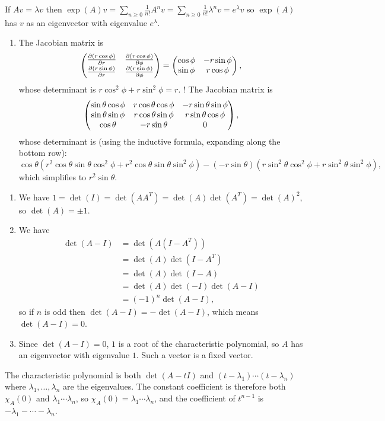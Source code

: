 \documentclass{article}
\begin{document}
\begin{Solution}
If \(Av=\lambda v\) then \(\exp(A)v=\sum_{n\geq
0}\frac{1}{n!}A^nv=\sum_{n\geq
0}\frac{1}{n!}\lambda^nv=e^{\lambda}v\) so \(\exp(A)\) has \(v\) as
an eigenvector with eigenvalue \(e^{\lambda}\).


\end{Solution}
\begin{Solution}
\begin{enumerate}
\item The Jacobian matrix is \[\begin{pmatrix} \frac{\partial(r\cos\phi)}{\partial
r} & \frac{\partial(r\cos\phi)}{\partial \phi}
\\ \frac{\partial(r\sin\phi)}{\partial r} &
\frac{\partial(r\sin\phi)}{\partial\phi}\end{pmatrix}=\begin{pmatrix} \cos\phi &
-r\sin\phi \\ \sin\phi & r\cos\phi\end{pmatrix},\] whose determinant is
\(r\cos^2\phi+r\sin^2\phi=r\). ! The Jacobian matrix is \[\begin{pmatrix}
\sin\theta\cos\phi & r\cos\theta\cos\phi & -r\sin\theta\sin\phi
\\ \sin\theta\sin\phi & r\cos\theta\sin\phi & r\sin\theta\cos\phi
\\ \cos\theta & -r\sin\theta & 0\end{pmatrix},\] whose determinant is (using
the inductive formula, expanding along the bottom row):
\[\cos\theta(r^2\cos\theta\sin\theta\cos^2\phi +
r^2\cos\theta\sin\theta\sin^2\phi) -
(-r\sin\theta)(r\sin^2\theta\cos^2\phi +
r\sin^2\theta\sin^2\phi),\] which simplifies to \(r^2\sin\theta\).


\end{enumerate}
\end{Solution}
\begin{Solution}\label{sol:exr:orthaxis}
\begin{enumerate}
\item We have \(1=\det(I)=\det(AA^T)=\det(A)\det(A^T)=\det(A)^2\), so
\(\det(A)=\pm 1\).
\item We have
\begin{align*}
\det(A-I)&=\det(A(I-A^T))\\
&=\det(A)\det(I-A^T)\\
&=\det(A)\det(I-A)\\
&=\det(A)\det(-I)\det(A-I)\\
&=(-1)^n\det(A-I),
\end{align*}
so if \(n\) is odd then \(\det(A-I)=-\det(A-I)\), which means
\(\det(A-I)=0\).
\item Since \(\det(A-I)=0\), \(1\) is a root of the characteristic
polynomial, so \(A\) has an eigenvector with eigenvalue
\(1\). Such a vector is a fixed vector. \qedhere


\end{enumerate}
\end{Solution}
\begin{Solution}
The characteristic polynomial is both \(\det(A-tI)\) and
\((t-\lambda_1)\cdots(t-\lambda_n)\) where
\(\lambda_1,\ldots,\lambda_n\) are the eigenvalues. The constant
coefficient is therefore both \(\chi_A(0)\) and
\(\lambda_1\cdots\lambda_n\), so
\(\chi_A(0)=\lambda_1\cdots\lambda_n\), and the coefficient of
\(t^{n-1}\) is \(-\lambda_1-\cdots-\lambda_n\).
\end{Solution}
\end{document}
